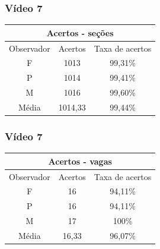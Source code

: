 \documentclass{beamer}
\begin{document}
\begin{frame}
	\frametitle{Vídeo 7}
\begin{center}
\begin{tabular}{|c||c||c|}
\hline
\multicolumn{3}{|c|}{Acertos - seções}  \\ \hline
Observador & Acertos & Taxa de acertos \\ \hline
F & 1013 & 99,31\% \\  \hline
P & 1014 & 99,41\% \\ \hline
M & 1016 & 99,60\% \\ \hline
Média & 1014,33 & 99,44\% \\
\hline
\end{tabular}
\end{center}
\end{frame}

\begin{frame}
\frametitle{Vídeo 7}

\begin{center}
\begin{tabular}{|c||c||c|}
\hline
\multicolumn{3}{|c|}{Acertos - vagas}  \\ \hline \hline
Observador & Acertos & Taxa de acertos \\ \hline
F & 16 & 94,11\% \\  \hline
P & 16 & 94,11\% \\ \hline
M & 17 & 100\% \\ \hline
Média & 16,33 & 96,07\% \\
\hline
\end{tabular}
\end{center}
\end{frame}
\end{document}
